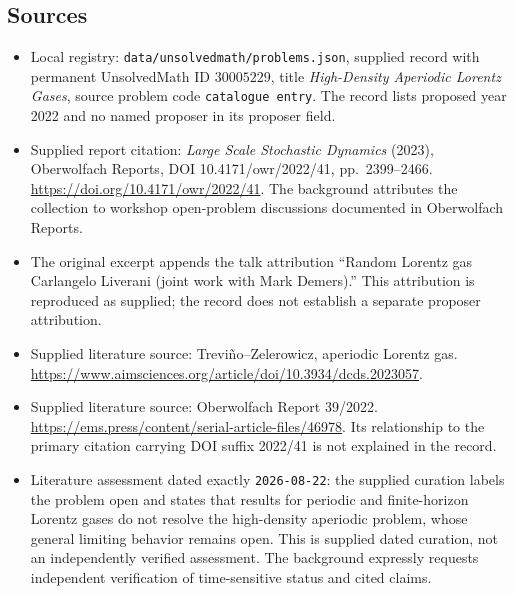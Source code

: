 \documentclass[11pt]{article}
\begin{document}
\subsection{Sources}
\begin{itemize}
\item Local registry: \texttt{data/unsolvedmath/problems.json}, supplied record with permanent UnsolvedMath ID \(30005229\), title \emph{High-Density Aperiodic Lorentz Gases}, source problem code \texttt{catalogue entry}. The record lists proposed year 2022 and no named proposer in its proposer field.
\item Supplied report citation: \emph{Large Scale Stochastic Dynamics} (2023), Oberwolfach Reports, DOI 10.4171/owr/2022/41, pp.\ 2399--2466. \url{https://doi.org/10.4171/owr/2022/41}. The background attributes the collection to workshop open-problem discussions documented in Oberwolfach Reports.
\item The original excerpt appends the talk attribution ``Random Lorentz gas Carlangelo Liverani (joint work with Mark Demers).'' This attribution is reproduced as supplied; the record does not establish a separate proposer attribution.
\item Supplied literature source: Trevi\~no--Zelerowicz, aperiodic Lorentz gas. \url{https://www.aimsciences.org/article/doi/10.3934/dcds.2023057}.
\item Supplied literature source: Oberwolfach Report 39/2022. \url{https://ems.press/content/serial-article-files/46978}. Its relationship to the primary citation carrying DOI suffix 2022/41 is not explained in the record.
\item Literature assessment dated exactly \texttt{2026-08-22}: the supplied curation labels the problem open and states that results for periodic and finite-horizon Lorentz gases do not resolve the high-density aperiodic problem, whose general limiting behavior remains open. This is supplied dated curation, not an independently verified assessment. The background expressly requests independent verification of time-sensitive status and cited claims.
\end{itemize}
\end{document}
